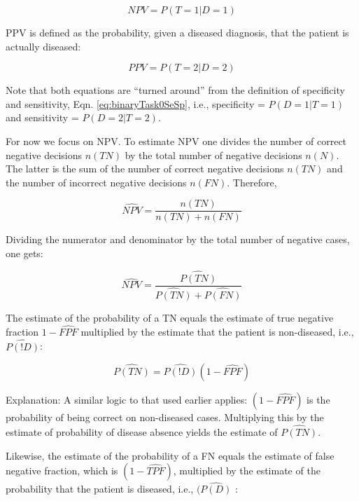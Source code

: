 \documentclass[
]{book}
\begin{document}
\begin{equation} 
NPV = P(T=1|D=1)
\label{eq:binaryTask0NPV1}
\end{equation}

PPV is defined as the probability, given a diseased diagnosis, that the patient is actually diseased:

\begin{equation} 
PPV = P(T=2|D=2)
\label{eq:binaryTask0PPV1}
\end{equation}

Note that both equations are ``turned around'' from the definition of specificity and sensitivity, Eqn. \eqref{eq:binaryTask0SeSp}, i.e., specificity = \(P(D=1|T=1)\) and sensitivity = \(P(D=2|T=2)\).

For now we focus on NPV. To estimate NPV one divides the number of correct negative decisions \(n(TN)\) by the total number of negative decisions \(n(N)\). The latter is the sum of the number of correct negative decisions \(n(TN)\) and the number of incorrect negative decisions \(n(FN)\). Therefore,

\begin{equation} 
\widehat{NPV}=\frac{n(TN)}{n(TN)+n(FN)}
\label{eq:binaryTask0NPV2}
\end{equation}

Dividing the numerator and denominator by the total number of negative cases, one gets:

\begin{equation} 
\widehat{NPV}=\frac{\widehat{P(TN)}}{\widehat{P(TN)}+\widehat{P(FN)}}
\label{eq:binaryTask0NPV3}
\end{equation}

The estimate of the probability of a TN equals the estimate of true negative fraction \(1-\widehat{FPF}\) multiplied by the estimate that the patient is non-diseased, i.e., \(\widehat{P(!D)}\):

\begin{equation} 
\widehat{P(TN)}=\widehat{P(!D)}(1-\widehat{FPF})
\label{eq:binaryTask0PTNEst}
\end{equation}

Explanation: A similar logic to that used earlier applies: \((1-\widehat{FPF})\) is the probability of being correct on non-diseased cases. Multiplying this by the estimate of probability of disease absence yields the estimate of \(\widehat{P(TN)}\).

Likewise, the estimate of the probability of a FN equals the estimate of false negative fraction, which is \((1-\widehat{TPF})\), multiplied by the estimate of the probability that the patient is diseased, i.e., \((\widehat{P(D)}\) :
\end{document}
